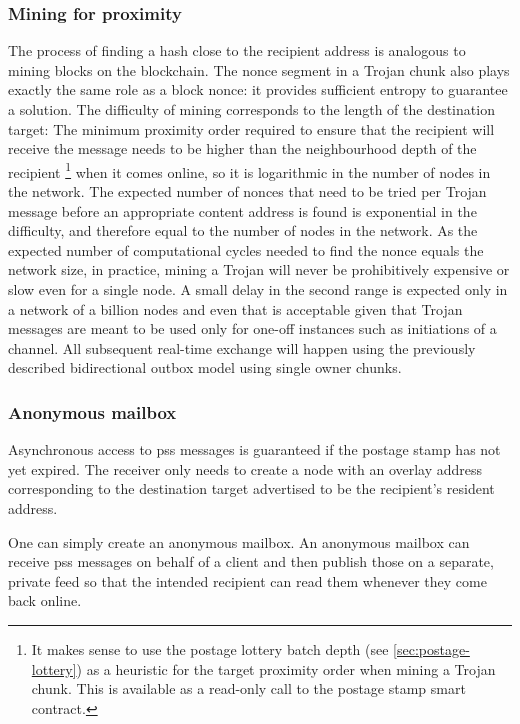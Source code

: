 \subsubsection{Mining for proximity}

The process of finding a hash close to the recipient address is analogous to mining blocks on the blockchain. The nonce segment in a Trojan chunk also plays exactly the same role as a block nonce: it provides sufficient entropy to guarantee a solution. The difficulty of mining corresponds to the length of the destination target: The minimum proximity order required to ensure that the recipient will receive the message needs to be higher than the neighbourhood depth of the recipient%
%
\footnote{It makes sense to use the postage lottery batch depth (see \ref{sec:postage-lottery}) as a heuristic for the target proximity order when mining a Trojan chunk. This is available as a read-only call to the postage stamp smart contract.}
%
when it comes online, so it is logarithmic in the number of nodes in the network. The expected number of nonces that need to be tried per Trojan message before an appropriate content address is found is exponential in the difficulty, and therefore equal to the number of nodes in the network. As the expected number of computational cycles needed to find the nonce equals the network size, in practice, mining a Trojan will never be prohibitively expensive or slow even for a single node. A small delay in the second range is expected only in a network of a billion nodes and even that is acceptable given that Trojan messages are meant to be used only for one-off instances such as initiations of a channel. All subsequent real-time exchange will happen using the previously described bidirectional outbox model using single owner chunks.


\subsubsection{Anonymous mailbox}

Asynchronous access to pss messages is guaranteed if the postage stamp has not yet expired. The receiver only needs to create a node with an overlay address corresponding to the destination target advertised to be the recipient's resident address.    

One can simply create an anonymous mailbox. An anonymous mailbox can receive pss messages on behalf of a client and then publish those on a separate, private feed so that the intended recipient can read them whenever they come back online.

